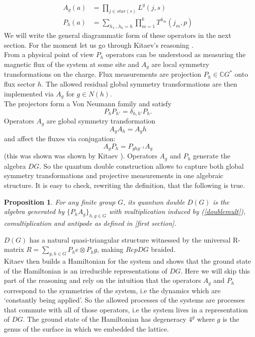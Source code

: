 \documentclass{article}
\newtheorem{proposition}[theorem]{Proposition}
\begin{document}
\begin{equation}\label{doubleonsite}
\begin{aligned}
A_g(a) &= \prod_{j \in star(s)} L^g(j,s) \\
P_h(a) &= \sum_{h_1...h_k=h} \prod_{m=1}^{k} T^{h_m}(j_m,p)
\end{aligned}
\end{equation}
We will write the general diagrammatic form of these operators in the next section. For the moment let us go through Kitaev's reasoning \cite{Kitaev03}.\\
From a physical point of view $P_h$ operators can be understood as measuring the magnetic flux of the system at some site and $A_g$ are local symmetry transformations on the charge. Flux measurements are projection $P_h \in \mathbb{C}G^*$ onto flux sector $h$. The allowed residual global symmetry transformations are then implemented via $A_g$ for $g \in N(h)$. \\
The projectors form a Von Neumann family and satisfy 
$$P_hP_{h'}= \delta_{h,h'} P_h.$$ 
Operators $A_g$ are global symmetry transformation 
$$A_gA_h = A_gh$$
and affect the fluxes via conjugation:
\begin{equation}\label{doublemult}
A_gP_h = P_{ghg^{-1}}A_g
\end{equation}
(this was shown was shown by Kitaev \cite{Kitaev03}). Operators $A_g$ and $P_h$ generate the algebra $DG$. So the quantum double construction allows to capture both global symmetry transformations and projective measurements in one algebraic structure. It is easy to check, rewriting the definition, that the following is true. 
\begin{proposition}
	For any finite group $G$, its quantum double $D(G)$ is the algebra generated by $\{P_hA_g\}_{h,g\in G}$ with multiplication induced by (\ref{doublemult}), comultiplication and antipode as defined in [first section]. 
\end{proposition}
$D(G)$ has a natural quasi-triangular structure witnessed by the universal R-matrix $R=\sum_{g,h \in G}P_he \otimes P_hg$, making $RepDG$ braided.\\
Kitaev then builds a Hamiltonian for the system and shows that the ground state of the Hamiltonian is an irreducible representations of $DG$. Here we will skip this part of the reasoning and rely on the intuition that the operators $A_g$ and $P_h$ correspond to the symmetries of the system, i.e the dynamics which are `constantly being applied'. So the allowed processes of the systems are processes that commute with all of those operators, i.e the system lives in a representation of $DG$. The ground state of the Hamiltonian has degeneracy $4^g$ where $g$ is the genus of the surface in which we embedded the lattice.\\
\end{document}
